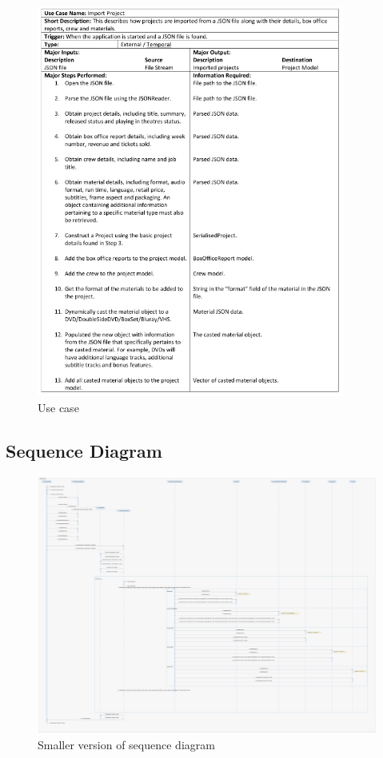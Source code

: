 \documentclass[
  english,
  a4paper,
,tablecaptionabove
]{scrartcl}
\begin{document}
\begin{figure}
\centering
\includegraphics[width=0.9\textwidth,height=\textheight]{images/interaction-design/import-project-use-case.png}
\caption{Use case}
\end{figure}

\newpage

\hypertarget{sequence-diagram}{%
\subsection{Sequence Diagram}\label{sequence-diagram}}

\begin{figure}
\centering
\includegraphics{images/interaction-design/sequence-diagram.png}
\caption{Smaller version of sequence diagram}
\end{figure}
\end{document}
